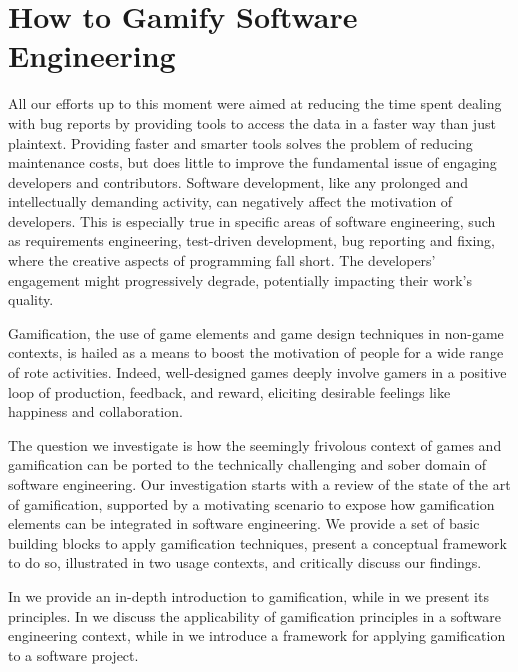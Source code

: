 
\chapter{How to Gamify Software Engineering}\label{ch:gamification}


All our efforts up to this moment were aimed at reducing the time spent dealing with bug reports by providing tools to access the data in a faster way than just plaintext.
Providing faster and smarter tools solves the problem of reducing maintenance costs, but does little to improve the fundamental issue of engaging developers and contributors.
Software development, like any prolonged and intellectually demanding activity, can negatively affect the motivation of developers.
This is especially true in specific areas of software engineering, such as requirements engineering, test-driven development, bug reporting and fixing, where the creative aspects of programming fall short.
The developers' engagement might progressively degrade, potentially impacting their work's quality.

Gamification, the use of game elements and game design techniques in non-game contexts, is hailed as a means to boost the motivation of people for a wide range of rote activities.
Indeed, well-designed games deeply involve gamers in a positive loop of production, feedback, and reward, eliciting desirable feelings like happiness and collaboration.

The question we investigate is how the seemingly frivolous context of games and gamification can be ported to the technically challenging and sober domain of software engineering.
Our investigation starts with a review of the state of the art of gamification, supported by a motivating scenario to expose how gamification elements can be integrated in software engineering.
We provide a set of basic building blocks to apply gamification techniques, present a conceptual framework to do so, illustrated in two usage contexts, and critically discuss our findings.

\structure

In  we provide an in-depth introduction to gamification, while in  we present its principles.
In  we discuss the applicability of gamification principles in a software engineering context, while in  we introduce a framework for applying gamification to a software project.


